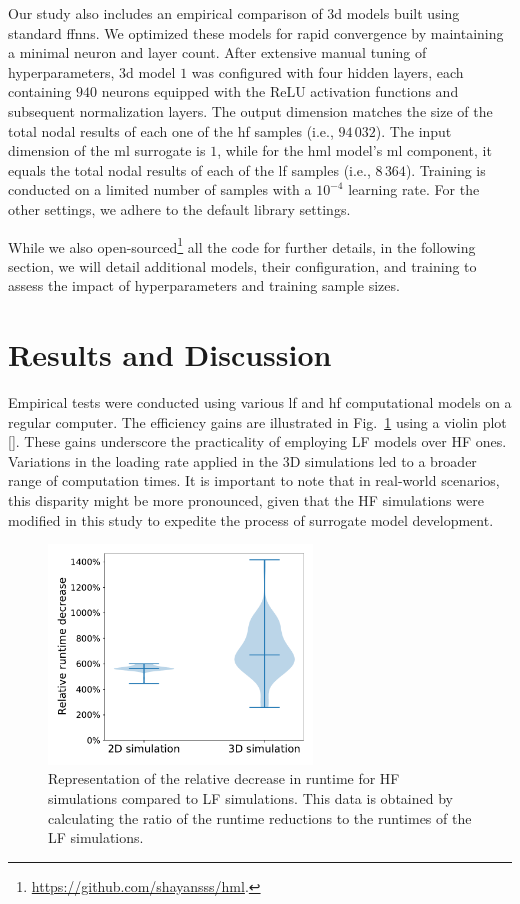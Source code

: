 \documentclass[12pt,a4paper]{report}
\begin{document}
Our study also includes an empirical comparison of \ac{3d} models built using standard \acp{ffnn}. We optimized these models for rapid convergence by maintaining a minimal neuron and layer count. After extensive manual tuning of hyperparameters, \ac{3d} model $1$ was configured with four hidden layers, each containing $940$ neurons equipped with the ReLU activation functions and subsequent normalization layers. The output dimension matches the size of the total nodal results of each one of the \ac{hf} samples (i.e., $94\,032$). The input dimension of the \ac{ml} surrogate is $1$, while for the \ac{hml} model's \ac{ml} component, it equals the total nodal results of each of the \ac{lf} samples (i.e., $8\,364$). Training is conducted on a limited number of samples with a $10^{-4}$ learning rate. For the other settings, we adhere to the default library settings.

While we also open-sourced\footnote{\href{https://github.com/shayansss/hml}{https://github.com/shayansss/hml}.} all the code for further details, in the following section, we will detail additional models, their configuration, and training to assess the impact of hyperparameters and training sample sizes.

\section{Results and Discussion}
%
Empirical tests were conducted using various \ac{lf} and \ac{hf} computational models on a regular computer. The efficiency gains are illustrated in Fig.~\ref{fig:runtime-comparison} using a violin plot [\cite{hintze1998}]. These gains underscore the practicality of employing LF models over HF ones. Variations in the loading rate applied in the 3D simulations led to a broader range of computation times. It is important to note that in real-world scenarios, this disparity might be more pronounced, given that the HF simulations were modified in this study to expedite the process of surrogate model development.
%
\begin{figure}\centering
\includegraphics[trim={0cm 0.5cm 0cm 0cm},clip,width=7cm]{comparison.pdf}
\caption{Representation of the relative decrease in runtime for HF simulations compared to LF simulations. This data is obtained by calculating the ratio of the runtime reductions to the runtimes of the LF simulations.\label{fig:runtime-comparison}}
\end{figure}
\end{document}
